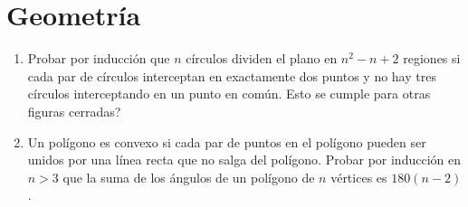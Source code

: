 \documentclass{article}
\begin{document}
\section{Geometría}

\begin{enumerate}
  \item Probar por inducción que $n$ círculos dividen el plano en
$n^2-n+2$ regiones si cada par de círculos interceptan en exactamente dos puntos y no hay tres círculos interceptando en un punto en común. Esto se cumple para otras figuras cerradas?

  \item Un polígono es convexo si cada par de puntos en el polígono
pueden ser unidos por una línea recta que no salga del polígono.
Probar por inducción en $n>3$ que la suma de los ángulos de un
polígono de $n$ vértices es $180(n-2)$.
\end{enumerate}
\end{document}
